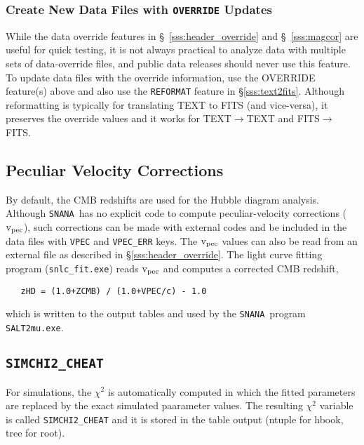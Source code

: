 \documentclass[12pt]{article}
\newcommand{\snana}{{\tt SNANA}}
\newcommand{\vpec}{{\rm v}_{\rm pec}}
\begin{document}
\subsubsection{Create New Data Files with {\tt OVERRIDE} Updates}
\label{sss:new_data_files}

While the data override features in 
\S~\ref{sss:header_override} and \S~\ref{sss:magcor}
are useful for quick testing, it is not always practical to 
analyze data with multiple sets of data-override files,
and public data releases should never use this feature.
To update data files with the override information,
use the OVERRIDE feature(s) above and also
use the {\tt REFORMAT} feature in \S\ref{sss:text2fits}.
Although reformatting is typically for translating TEXT to FITS
(and vice-versa), it preserves the override values and
it works for TEXT$\to$TEXT and FITS$\to$FITS. 

\subsection{Peculiar Velocity Corrections }
\label{subsec:vpec}

By default, the CMB redshifts are used for the Hubble diagram
analysis. Although \snana\ has no explicit code to compute
peculiar-velocity corrections ($\vpec$), such corrections
can be made with external codes and be included in the data files
with {\tt VPEC} and {\tt VPEC\_ERR} keys. The $\vpec$ values
can also be read from an external file as described in 
\S\ref{sss:header_override}. The light curve fitting program
({\tt snlc\_fit.exe}) reads $\vpec$ and computes a corrected
CMB redshift,
\begin{verbatim}
   zHD = (1.0+ZCMB) / (1.0+VPEC/c) - 1.0 
\end{verbatim}
which is written to the output tables and used by the \snana\ program
{\tt SALT2mu.exe}.



\subsection{{\tt SIMCHI2\_CHEAT} }
\label{subsec:simchi2_chear}

For simulations, the $\chi^2$ is automatically computed
in which the fitted parameters are replaced by the 
exact simulated paarameter values. The resulting $\chi^2$ variable
is called {\tt SIMCHI2\_CHEAT} and it is stored in the 
table output (ntuple for hbook, tree for root).
\end{document}
